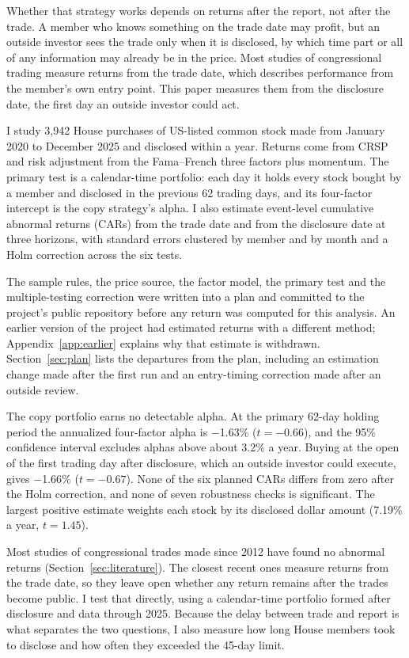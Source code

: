 \documentclass[11pt]{article}
\newcommand{\m}{\ensuremath{-}}
\begin{document}
Whether that strategy works depends on returns after the report, not after the trade. A member who knows something on the trade date may profit, but an outside investor sees the trade only when it is disclosed, by which time part or all of any information may already be in the price. Most studies of congressional trading measure returns from the trade date, which describes performance from the member's own entry point. This paper measures them from the disclosure date, the first day an outside investor could act.

I study 3,942 House purchases of US-listed common stock made from January 2020 to December 2025 and disclosed within a year. Returns come from CRSP and risk adjustment from the Fama--French three factors plus momentum. The primary test is a calendar-time portfolio: each day it holds every stock bought by a member and disclosed in the previous 62 trading days, and its four-factor intercept is the copy strategy's alpha. I also estimate event-level cumulative abnormal returns (CARs) from the trade date and from the disclosure date at three horizons, with standard errors clustered by member and by month and a Holm correction across the six tests.

The sample rules, the price source, the factor model, the primary test and the multiple-testing correction were written into a plan and committed to the project's public repository before any return was computed for this analysis. An earlier version of the project had estimated returns with a different method; Appendix~\ref{app:earlier} explains why that estimate is withdrawn. Section~\ref{sec:plan} lists the departures from the plan, including an estimation change made after the first run and an entry-timing correction made after an outside review.

The copy portfolio earns no detectable alpha. At the primary 62-day holding period the annualized four-factor alpha is \m1.63\% ($t = \m0.66$), and the 95\% confidence interval excludes alphas above about 3.2\% a year. Buying at the open of the first trading day after disclosure, which an outside investor could execute, gives \m1.66\% ($t = \m0.67$). None of the six planned CARs differs from zero after the Holm correction, and none of seven robustness checks is significant. The largest positive estimate weights each stock by its disclosed dollar amount (7.19\% a year, $t = 1.45$).

Most studies of congressional trades made since 2012 have found no abnormal returns (Section~\ref{sec:literature}). The closest recent ones measure returns from the trade date, so they leave open whether any return remains after the trades become public. I test that directly, using a calendar-time portfolio formed after disclosure and data through 2025. Because the delay between trade and report is what separates the two questions, I also measure how long House members took to disclose and how often they exceeded the 45-day limit.
\end{document}
